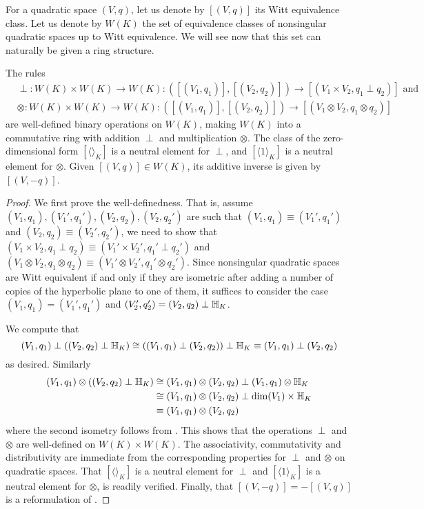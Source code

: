 \documentclass[12pt, leqno, british]{amsart}
\begin{document}
For a quadratic space $(V, q)$, let us denote by $[(V, q)]$ its Witt equivalence class.
Let us denote by $W(K)$ the set of equivalence classes of nonsingular quadratic spaces up to Witt equivalence.
We will see now that this set can naturally be given a ring structure.
\begin{thm}\label{T:WittRing}
The rules
\begin{align*}
&\perp : W(K) \times W(K) \to W(K) : ([(V_1, q_1)], [(V_2, q_2)]) \to [(V_1 \times V_2, q_1 \perp q_2)] \text{ and}\\
&\otimes : W(K) \times W(K) \to W(K) : ([(V_1, q_1)], [(V_2, q_2)]) \to [(V_1 \otimes V_2, q_1 \otimes q_2)]
\end{align*}
are well-defined binary operations on $W(K)$, making $W(K)$ into a commutative ring with addition $\perp$ and multiplication $\otimes$.
The class of the zero-dimensional form $[\langle \rangle_K]$ is a neutral element for $\perp$, and $[\langle 1 \rangle_K]$ is a neutral element for $\otimes$.
Given $[(V, q)] \in W(K)$, its additive inverse is given by $[(V, -q)]$.
\end{thm}
\begin{proof}
We first prove the well-definedness.
That is, assume $(V_1, q_1), (V_1', q_1'), (V_2, q_2), (V_2, q_2')$ are such that $(V_1, q_1) \equiv (V_1', q_1')$ and $(V_2, q_2) \equiv (V_2', q_2')$, we need to show that $(V_1 \times V_2, q_1 \perp q_2) \equiv (V_1' \times V_2', q_1' \perp q_2')$ and $(V_1 \otimes V_2, q_1 \otimes q_2) \equiv (V_1' \otimes V_2', q_1' \otimes q_2')$.
Since nonsingular quadratic spaces are Witt equivalent if and only if they are isometric after adding a number of copies of the hyperbolic plane to one of them, it suffices to consider the case $(V_1, q_1) = (V_1', q_1')$ and $(V_2', q_2') = (V_2, q_2) \perp \mathbb{H}_K$.

We compute that
\begin{displaymath}
(V_1, q_1) \perp ((V_2, q_2) \perp \mathbb{H}_K) \cong ((V_1, q_1) \perp (V_2, q_2)) \perp \mathbb{H}_K \equiv (V_1, q_1) \perp (V_2, q_2)
\end{displaymath}
as desired.
Similarly
\begin{align*}
(V_1, q_1) \otimes ((V_2, q_2) \perp \mathbb{H}_K) &\cong (V_1, q_1) \otimes (V_2, q_2) \perp (V_1, q_1) \otimes \mathbb{H}_K \\
&\cong (V_1, q_1) \otimes (V_2, q_2) \perp \dim(V_1) \times \mathbb{H}_K \\
&\equiv (V_1, q_1) \otimes (V_2, q_2)
\end{align*}
where the second isometry follows from .
This shows that the operations $\perp$ and $\otimes$ are well-defined on $W(K) \times W(K)$.
The associativity, commutativity and distributivity are immediate from the corresponding properties for $\perp$ and $\otimes$ on quadratic spaces.
That $[\langle \rangle_K]$ is a neutral element for $\perp$ and $[\langle 1 \rangle_K]$ is a neutral element for $\otimes$, is readily verified.
Finally, that $[(V, -q)] = -[(V, q)]$ is a reformulation of .
\end{proof}
\end{document}
